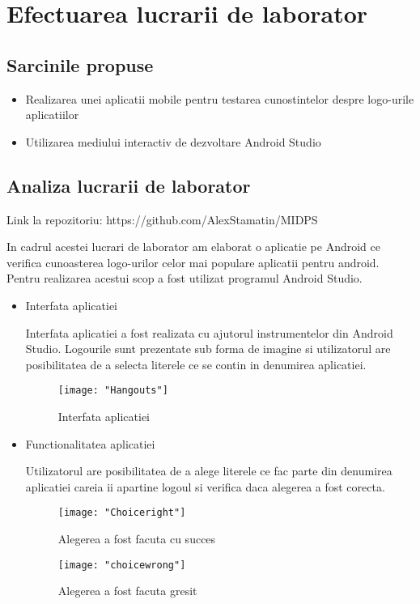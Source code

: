 \section{Efectuarea lucrarii de laborator}

\subsection{Sarcinile propuse}
\begin{itemize}
	\item Realizarea unei aplicatii mobile pentru testarea cunostintelor despre logo-urile aplicatiilor 
	\item Utilizarea mediului interactiv de dezvoltare Android Studio
\end{itemize}


\subsection{Analiza lucrarii de laborator}

Link la repozitoriu: https://github.com/AlexStamatin/MIDPS
	
	
	In cadrul acestei lucrari de laborator am elaborat o aplicatie pe Android ce verifica cunoasterea logo-urilor celor mai populare aplicatii pentru android. Pentru realizarea acestui scop a fost utilizat programul Android Studio. 

\begin{itemize}
	\item Interfata aplicatiei
	

	Interfata aplicatiei a fost realizata cu ajutorul instrumentelor 	din Android Studio. Logourile sunt prezentate sub forma de imagine si utilizatorul are posibilitatea de a selecta literele ce se contin in denumirea aplicatiei.
		\begin{figure}[h!]
			\centering
 			 \texttt{[image: "Hangouts"]}
 			 \caption{Interfata aplicatiei}
 			 \label{fig:Pagina principala}
		\end{figure}	
	\item Functionalitatea aplicatiei
	
	Utilizatorul are posibilitatea de a alege literele ce fac parte din denumirea aplicatiei careia ii apartine logoul si verifica daca alegerea a fost corecta.
	\begin{figure}[h!]
			\centering
 			 \texttt{[image: "Choiceright"]}
 			 \caption{Alegerea a fost facuta cu succes}
 			 \label{fig:Calcui}
		\end{figure}
		


	\begin{figure}[h!]
			\centering
 			 \texttt{[image: "choicewrong"]}
 			 \caption{Alegerea a fost facuta gresit}
 			 \label{fig:Calcui}
		\end{figure}


\end{itemize}
